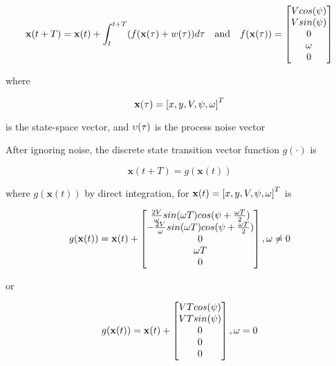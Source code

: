 \begin{equation}
\begin{aligned}
\mathbf{x}(t+T) = \mathbf{x}(t) + \int_{t}^{t+T}(f(\mathbf{x}(\tau)+w(\tau) )d\tau &&\text{and}&& f(\mathbf{x(\tau)})=  \begin{bmatrix}{V} cos({\psi}) \\ {V} sin({\psi}) \\ 0 \\ \omega \\ 0  \end{bmatrix}
\end{aligned}
\end{equation}

where 

\begin{equation}
\mathbf{x(\tau)} = \left[x,y,{V}, {\psi},\omega\right]^{T}
\end{equation}

is the state-space vector, and ${\upsilon}(\tau ) $ is the process noise vector

After ignoring noise,  the discrete state transition vector function $g(\cdot)$ is


\begin{equation}
\mathbf{x}(t+T) = g\left(\mathbf{x}(t)\right)
\end{equation}

where $g(\mathbf{x}(t))$ by direct integration, for $\mathbf{x}(t) =\left[x,y,{V}, {\psi},\omega\right]^{T} $ is



\begin{equation}
g(\mathbf{x}(t)) = \mathbf{x}(t) +  \begin{bmatrix}
\frac{2{V}}{\omega}sin(\omega T)cos({\psi} + \frac{\omega T}{2})\\
-\frac{2{V}}{\omega}sin(\omega T)cos({\psi} + \frac{\omega T}{2})\\
0 \\
\omega T \\
0
\end{bmatrix} , \omega \neq 0
\end{equation}

or


\begin{equation}
g(\mathbf{x}(t)) = \mathbf{x}(t) +  \begin{bmatrix}
{V} T cos({\psi})\\
{V} T sin({\psi})\\
0 \\
0 \\
0
\end{bmatrix} ,  \omega = 0
\end{equation}

